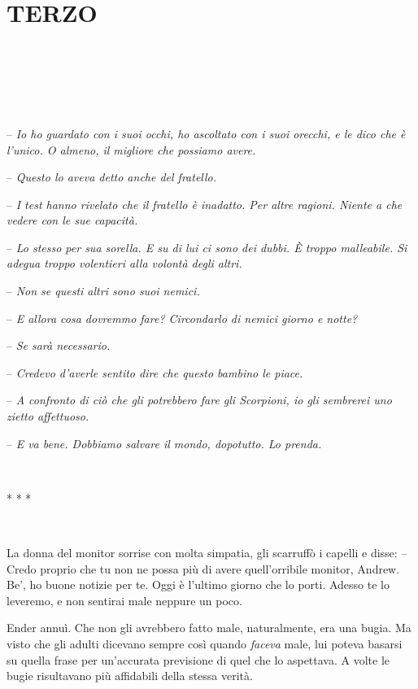 \mainmatter

\chapter{TERZO}

{~}

{~}

{~}

{-- \emph{Io ho guardato con i suoi occhi, ho ascoltato con i suoi
		orecchi, e le dico che è l'unico. O almeno, il migliore che possiamo
		avere.}}

{-- \emph{Questo lo aveva detto anche del fratello.}}

{-- \emph{I test hanno rivelato che il fratello è inadatto. Per altre
		ragioni. Niente a che vedere con le sue capacità.}}

{-- \emph{Lo stesso per sua sorella. E su di lui ci sono dei dubbi. È
		troppo malleabile. Si adegua troppo volentieri alla volontà degli
		altri.}}

{-- \emph{Non se questi altri sono suoi nemici.}}

{-- \emph{E allora cosa dovremmo fare? Circondarlo di nemici giorno e
		notte?}}

{-- \emph{Se sarà necessario.}}

{-- \emph{Credevo d'averle sentito dire che questo bambino le piace.}}

{-- \emph{A confronto di ciò che gli potrebbero fare gli Scorpioni, io
		gli sembrerei uno zietto affettuoso.}}

{-- \emph{E va bene. Dobbiamo salvare il mondo, dopotutto. Lo prenda.}}

{~}

\begin{center}
	{* * *}
\end{center}

{~}

{La donna del monitor sorrise con molta simpatia, gli scarruffò i
	capelli e disse: -- Credo proprio che tu non ne possa più di avere
	quell'orribile monitor, Andrew. Be', ho buone notizie per te. Oggi è
	l'ultimo giorno che lo porti. Adesso te lo leveremo, e non sentirai male
	neppure un poco.}

{Ender annuì. Che non gli avrebbero fatto male, naturalmente, era una
	bugia. Ma visto che gli adulti dicevano sempre così quando \emph{faceva}
	male, lui poteva basarsi su quella frase per un'accurata previsione di
	quel che lo aspettava. A volte le bugie risultavano più affidabili della
	stessa verità.}

